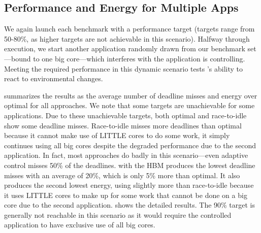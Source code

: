 

\subsection{Performance and Energy for Multiple Apps}

We again launch each benchmark with a performance target (targets
range from 50-80\%, as higher targets are not achievable in this
scenario).  Halfway through execution, we start another application
randomly drawn from our benchmark set---bound to one big core---which
interferes with the application \SYSTEM{} is controlling.  Meeting the
required performance in this dynamic scenario tests \SYSTEM{}'s
ability to react to environmental changes.


 summarizes the results as the average number of
deadline misses and energy over optimal for all approaches.  We note
that some targets are unachievable for some applications. Due to these
unachievable targets, both optimal and race-to-idle show some deadline
misses. Race-to-idle misses more deadlines than optimal because it
cannot make use of LITTLE cores to do some work, it simply continues
using all big cores despite the degraded performance due to the second
application.  In fact, most approaches do badly in this
scenario---even adaptive control misses 50\% of the deadlines.
\SYSTEM{} with the HBM produces the lowest deadline misses with an
average of 20\%, which is only 5\% more than optimal.  It also
produces the second lowest energy, using slightly more than
race-to-idle because it uses LITTLE cores to make up for some work
that cannot be done on a big core due to the second application.
 shows the detailed results.  The 90\% target is
generally not reachable in this scenario as it would require the
controlled application to have exclusive use of all big cores.



